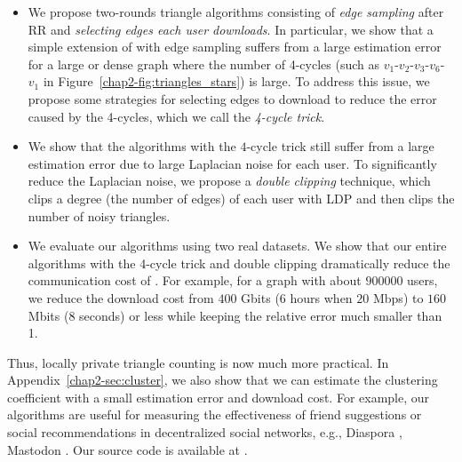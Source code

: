 \begin{itemize}
    \item We propose two-rounds triangle algorithms
consisting of \textit{edge sampling} after RR and \textit{selecting edges each user downloads}.
In particular, we show that a simple extension of \cite{Imola_USENIX21} with edge sampling suffers from a large estimation error for a large or dense graph where the number of 4-cycles (such as $v_1$-$v_2$-$v_3$-$v_6$-$v_1$
in Figure~\ref{chap2-fig:triangles_stars}) is large.
To address this issue, we propose some strategies for selecting edges to download to reduce the error caused by the 4-cycles, which we call the \textit{4-cycle trick}.
\item We
show that
the algorithms with the $4$-cycle trick
still suffer from a large estimation error due to
large Laplacian noise for each user.
To significantly reduce the Laplacian noise, 
we
propose a \textit{double clipping} technique,
which clips 
a degree (the number of edges) of each user 
with LDP and then clips the number of noisy triangles. 
\item We evaluate our algorithms using two real datasets.
We show that our entire algorithms with the 4-cycle trick and double clipping
dramatically reduce the communication cost
of
\cite{Imola_USENIX21}.
For example,
for a graph with about $900000$ users,
we reduce the download cost from $400$ Gbits ($6$ hours when $20$ Mbps) to 
$160$ Mbits ($8$ seconds) or less 
while keeping the relative error much smaller than 1.
\end{itemize}
Thus, locally private triangle counting is now much more practical. 
In Appendix~\ref{chap2-sec:cluster}, we also show that we can estimate the clustering coefficient with a small estimation error and download cost. 
For example, our algorithms are useful for measuring the effectiveness of friend suggestions or social recommendations in decentralized 
social networks, 
e.g., Diaspora \cite{Diaspora}, Mastodon \cite{Mastodon}. 
Our source code
is available at 
\cite{TriangleLDP}. 

